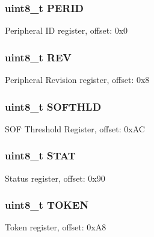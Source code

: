 \subsubsection[{P\+E\+R\+I\+D}]{\setlength{\rightskip}{0pt plus 5cm}uint8\+\_\+t P\+E\+R\+I\+D}\label{struct_u_s_b___mem_map_af90a61467080255b062e7a3ed7179e3a}
Peripheral I\+D register, offset\+: 0x0 \hypertarget{struct_u_s_b___mem_map_a95133aaa5ed5ba8a03154f5fe270b84a}{}
\subsubsection[{R\+E\+V}]{\setlength{\rightskip}{0pt plus 5cm}uint8\+\_\+t R\+E\+V}\label{struct_u_s_b___mem_map_a95133aaa5ed5ba8a03154f5fe270b84a}
Peripheral Revision register, offset\+: 0x8 \hypertarget{struct_u_s_b___mem_map_a3c57aac21bb5a6e35c3002cb847140b7}{}
\subsubsection[{S\+O\+F\+T\+H\+L\+D}]{\setlength{\rightskip}{0pt plus 5cm}uint8\+\_\+t S\+O\+F\+T\+H\+L\+D}\label{struct_u_s_b___mem_map_a3c57aac21bb5a6e35c3002cb847140b7}
S\+O\+F Threshold Register, offset\+: 0x\+A\+C \hypertarget{struct_u_s_b___mem_map_a29552ccb0992dbc97b7cf8259c0c43fe}{}
\subsubsection[{S\+T\+A\+T}]{\setlength{\rightskip}{0pt plus 5cm}uint8\+\_\+t S\+T\+A\+T}\label{struct_u_s_b___mem_map_a29552ccb0992dbc97b7cf8259c0c43fe}
Status register, offset\+: 0x90 \hypertarget{struct_u_s_b___mem_map_ab7110e88231d886d104697baee83f6f0}{}
\subsubsection[{T\+O\+K\+E\+N}]{\setlength{\rightskip}{0pt plus 5cm}uint8\+\_\+t T\+O\+K\+E\+N}\label{struct_u_s_b___mem_map_ab7110e88231d886d104697baee83f6f0}
Token register, offset\+: 0x\+A8 \hypertarget{struct_u_s_b___mem_map_ad8f50417f356298d1ee6237db0aadbbc}{}
